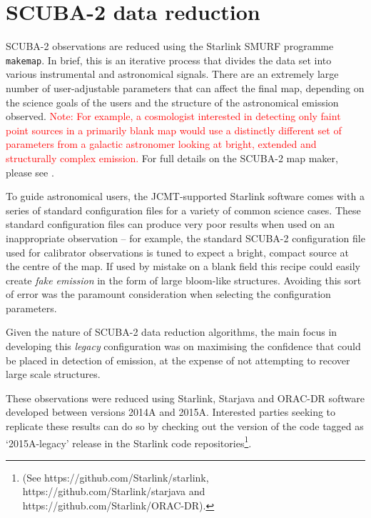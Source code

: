 \documentclass[twocolumn,times]{aastex6}
\newcommand{\note}[1]{\textcolor{red}{Note: #1}}
\begin{document}
\section{SCUBA-2 data reduction}
\label{sec:dr}
SCUBA-2 observations are reduced using the Starlink SMURF programme
\texttt{makemap}. In brief, this is an iterative process that divides
the data set into various instrumental and astronomical signals. There
are an extremely large number of user-adjustable parameters that can
affect the final map, depending on the science goals of the users and
the structure of the astronomical emission observed. \note{For example, a
cosmologist interested in detecting only faint point sources in a
primarily blank map would use a distinctly different set of parameters
from a galactic astronomer looking at bright, extended and
structurally complex emission.} For full details on the SCUBA-2 map
maker, please see \citet{Chapin2013}.


To guide astronomical users, the JCMT-supported Starlink software
comes with a series of standard configuration files for a variety of
common science cases.
These standard configuration files can produce very poor results when
used on an inappropriate observation -- for example, the standard
SCUBA-2 configuration file used for calibrator observations is tuned
to expect a bright, compact source at the centre of the map. If used
by mistake on a blank field this recipe could easily create \emph{fake
  emission} in the form of large bloom-like structures. Avoiding this
sort of error was the paramount consideration when selecting the
configuration parameters.

Given the nature of SCUBA-2 data reduction algorithms, the main focus
in developing this \emph{legacy} configuration was on maximising the
confidence that could be placed in detection of emission, at the
expense of not attempting to recover large scale structures.

These observations were reduced using Starlink, Starjava and ORAC-DR
software developed between versions 2014A and 2015A. Interested
parties seeking to replicate these results can do so by checking out
the version of the code tagged as `2015A-legacy' release in the
Starlink code repositories\footnote{(See
  https://github.com/Starlink/starlink,
  https://github.com/Starlink/starjava and
  https://github.com/Starlink/ORAC-DR).}.
\end{document}
